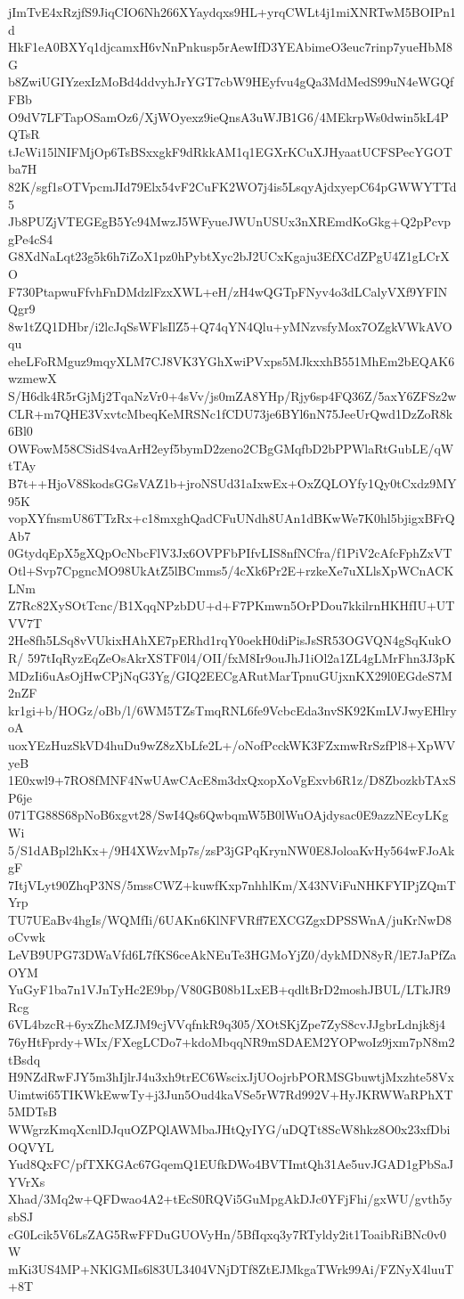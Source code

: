jImTvE4xRzjfS9JiqCIO6Nh266XYaydqxs9HL+yrqCWLt4j1miXNRTwM5BOIPn1d
HkF1eA0BXYq1djcamxH6vNnPnkusp5rAewIfD3YEAbimeO3euc7rinp7yueHbM8G
b8ZwiUGIYzexIzMoBd4ddvyhJrYGT7cbW9HEyfvu4gQa3MdMedS99uN4eWGQfFBb
O9dV7LFTapOSamOz6/XjWOyexz9ieQnsA3uWJB1G6/4MEkrpWs0dwin5kL4PQTsR
tJcWi15lNIFMjOp6TsBSxxgkF9dRkkAM1q1EGXrKCuXJHyaatUCFSPecYGOTba7H
82K/sgf1sOTVpcmJId79Elx54vF2CuFK2WO7j4is5LsqyAjdxyepC64pGWWYTTd5
Jb8PUZjVTEGEgB5Yc94MwzJ5WFyueJWUnUSUx3nXREmdKoGkg+Q2pPcvpgPe4cS4
G8XdNaLqt23g5k6h7iZoX1pz0hPybtXyc2bJ2UCxKgaju3EfXCdZPgU4Z1gLCrXO
F730PtapwuFfvhFnDMdzlFzxXWL+eH/zH4wQGTpFNyv4o3dLCalyVXf9YFINQgr9
8w1tZQ1DHbr/i2lcJqSsWFlsIlZ5+Q74qYN4Qlu+yMNzvsfyMox7OZgkVWkAVOqu
eheLFoRMguz9mqyXLM7CJ8VK3YGhXwiPVxps5MJkxxhB551MhEm2bEQAK6wzmewX
S/H6dk4R5rGjMj2TqaNzVr0+4sVv/js0mZA8YHp/Rjy6sp4FQ36Z/5axY6ZFSz2w
CLR+m7QHE3VxvtcMbeqKeMRSNc1fCDU73je6BYl6nN75JeeUrQwd1DzZoR8k6Bl0
OWFowM58CSidS4vaArH2eyf5bymD2zeno2CBgGMqfbD2bPPWlaRtGubLE/qWtTAy
B7t++HjoV8SkodsGGsVAZ1b+jroNSUd31aIxwEx+OxZQLOYfy1Qy0tCxdz9MY95K
vopXYfnsmU86TTzRx+c18mxghQadCFuUNdh8UAn1dBKwWe7K0hl5bjigxBFrQAb7
0GtydqEpX5gXQpOcNbcFlV3Jx6OVPFbPIfvLIS8nfNCfra/f1PiV2cAfcFphZxVT
Otl+Svp7CpgncMO98UkAtZ5lBCmms5/4cXk6Pr2E+rzkeXe7uXLlsXpWCnACKLNm
Z7Rc82XySOtTcnc/B1XqqNPzbDU+d+F7PKmwn5OrPDou7kkilrnHKHfIU+UTVV7T
2He8fh5LSq8vVUkixHAhXE7pERhd1rqY0oekH0diPisJsSR53OGVQN4gSqKukOR/
597tIqRyzEqZeOsAkrXSTF0l4/OII/fxM8Ir9ouJhJ1iOl2a1ZL4gLMrFhn3J3pK
MDzIi6uAsOjHwCPjNqG3Yg/GIQ2EECgARutMarTpnuGUjxnKX29l0EGdeS7M2nZF
kr1gi+b/HOGz/oBb/l/6WM5TZsTmqRNL6fe9VcbcEda3nvSK92KmLVJwyEHlryoA
uoxYEzHuzSkVD4huDu9wZ8zXbLfe2L+/oNofPcckWK3FZxmwRrSzfPl8+XpWVyeB
1E0xwl9+7RO8fMNF4NwUAwCAcE8m3dxQxopXoVgExvb6R1z/D8ZbozkbTAxSP6je
071TG88S68pNoB6xgvt28/SwI4Qs6QwbqmW5B0lWuOAjdysac0E9azzNEcyLKgWi
5/S1dABpl2hKx+/9H4XWzvMp7s/zsP3jGPqKrynNW0E8JoloaKvHy564wFJoAkgF
7ItjVLyt90ZhqP3NS/5mssCWZ+kuwfKxp7nhhlKm/X43NViFuNHKFYIPjZQmTYrp
TU7UEaBv4hgIs/WQMfIi/6UAKn6KlNFVRff7EXCGZgxDPSSWnA/juKrNwD8oCvwk
LeVB9UPG73DWaVfd6L7fKS6ceAkNEuTe3HGMoYjZ0/dykMDN8yR/lE7JaPfZaOYM
YuGyF1ba7n1VJnTyHc2E9bp/V80GB08b1LxEB+qdltBrD2moshJBUL/LTkJR9Rcg
6VL4bzcR+6yxZhcMZJM9cjVVqfnkR9q305/XOtSKjZpe7ZyS8cvJJgbrLdnjk8j4
76yHtFprdy+WIx/FXegLCDo7+kdoMbqqNR9mSDAEM2YOPwoIz9jxm7pN8m2tBsdq
H9NZdRwFJY5m3hIjlrJ4u3xh9trEC6WscixJjUOojrbPORMSGbuwtjMxzhte58Vx
Uimtwi65TIKWkEwwTy+j3Jun5Oud4kaVSe5rW7Rd992V+HyJKRWWaRPhXT5MDTsB
WWgrzKmqXcnlDJquOZPQlAWMbaJHtQyIYG/uDQTt8ScW8hkz8O0x23xfDbiOQVYL
Yud8QxFC/pfTXKGAc67GqemQ1EUfkDWo4BVTImtQh31Ae5uvJGAD1gPbSaJYVrXs
Xhad/3Mq2w+QFDwao4A2+tEcS0RQVi5GuMpgAkDJc0YFjFhi/gxWU/gvth5ysbSJ
cG0Lcik5V6LsZAG5RwFFDuGUOVyHn/5BfIqxq3y7RTyldy2it1ToaibRiBNc0v0W
mKi3US4MP+NKlGMIs6l83UL3404VNjDTf8ZtEJMkgaTWrk99Ai/FZNyX4luuT+8T
